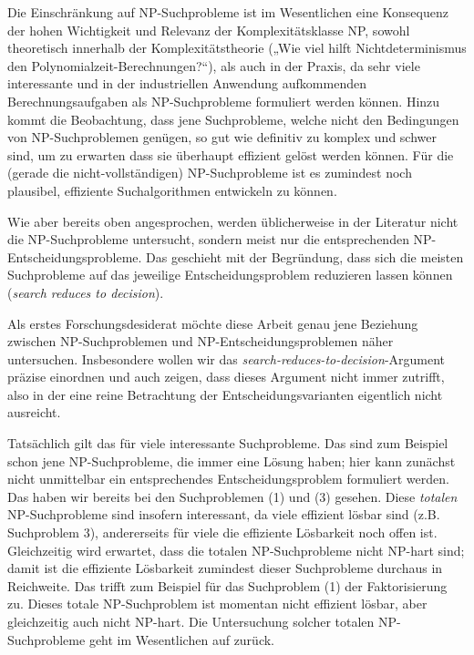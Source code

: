 Die Einschränkung auf NP-Suchprobleme ist im Wesentlichen eine Konsequenz der hohen Wichtigkeit und Relevanz der Komplexitätsklasse NP, sowohl theoretisch innerhalb der Komplexitätstheorie („Wie viel hilft Nichtdeterminismus den Polynomialzeit-Berechnungen?“), als auch in der Praxis, da sehr viele interessante und in der industriellen Anwendung aufkommenden Berechnungsaufgaben als  NP-Suchprobleme formuliert werden können. Hinzu kommt die Beobachtung, dass jene Suchprobleme, welche nicht den Bedingungen von NP-Suchproblemen genügen, so gut wie definitiv zu komplex und schwer sind, um zu erwarten dass sie überhaupt effizient gelöst werden können. Für die (gerade die nicht-vollständigen) NP-Suchprobleme ist es zumindest noch plausibel, effiziente Suchalgorithmen entwickeln zu können.

Wie aber bereits oben angesprochen, werden üblicherweise in der Literatur nicht die NP-Suchprobleme untersucht, sondern meist nur die entsprechenden NP-Entscheidungsprobleme. Das geschieht mit der Begründung, dass sich die meisten Suchprobleme auf das jeweilige Entscheidungsproblem reduzieren lassen können (\emph{search reduces to decision}). 

Als erstes Forschungsdesiderat möchte diese Arbeit genau jene Beziehung zwischen NP-Suchproblemen und NP-Entscheidungsproblemen näher untersuchen. 
Insbesondere wollen wir das \emph{search-reduces-to-decision}-Argument präzise einordnen und auch zeigen, dass dieses Argument nicht immer zutrifft, also in der eine reine Betrachtung der Entscheidungsvarianten eigentlich nicht ausreicht. 

Tatsächlich gilt das für viele interessante Suchprobleme. Das sind zum Beispiel schon jene NP-Suchprobleme, die immer eine Lösung haben; hier kann zunächst nicht unmittelbar ein entsprechendes Entscheidungsproblem formuliert werden.
Das haben wir bereits bei den Suchproblemen (1) und (3) gesehen.
Diese \emph{totalen} NP-Suchprobleme sind insofern interessant, da viele effizient lösbar sind (z.B. Suchproblem 3), andererseits für viele die effiziente Lösbarkeit noch offen ist. Gleichzeitig wird erwartet, dass die totalen NP-Suchprobleme nicht NP-hart sind; damit ist die effiziente Lösbarkeit zumindest dieser Suchprobleme durchaus in Reichweite. 
Das trifft zum Beispiel für das Suchproblem (1) der Faktorisierung zu. Dieses totale NP-Suchproblem ist momentan nicht effizient lösbar, aber gleichzeitig auch nicht NP-hart. Die Untersuchung solcher totalen NP-Suchprobleme geht im Wesentlichen auf \textcites{johnson_how_1988}{megiddo_total_1991} zurück.

